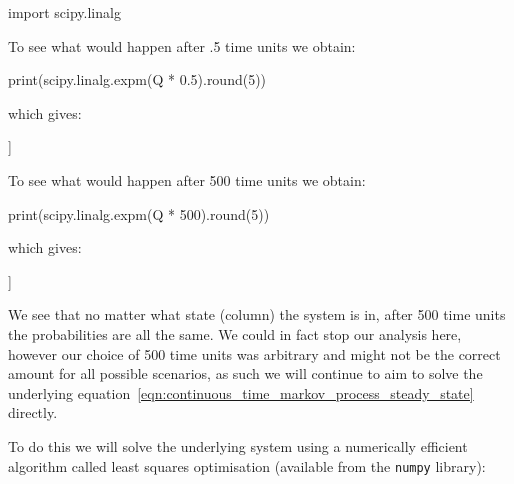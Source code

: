 \begin{pyin}
import scipy.linalg
\end{pyin}

To see what would happen after .5 time units we obtain:

\begin{pyin}
print(scipy.linalg.expm(Q * 0.5).round(5))
\end{pyin}

which gives:

\begin{pyout}
[[0.10492 0.21254 0.20377 0.17142 0.13021 0.09564 0.0815 ]
 [0.08501 0.18292 0.18666 0.1708  0.14377 0.1189  0.11194]
 [0.06521 0.14933 0.16338 0.16478 0.15633 0.14751 0.15346]
 [0.04388 0.10931 0.13183 0.15181 0.16777 0.18398 0.21142]
 [0.02667 0.07361 0.10005 0.13422 0.17393 0.2189  0.27262]
 [0.01567 0.0487  0.07552 0.11775 0.17512 0.24484 0.32239]
 [0.01068 0.03668 0.06286 0.10824 0.17448 0.25791 0.34914]]
\end{pyout}

To see what would happen after 500 time units we obtain:

\begin{pyin}
print(scipy.linalg.expm(Q * 500).round(5))
\end{pyin}

which gives:

\begin{pyout}
[[0.03431 0.08577 0.10722 0.13402 0.16752 0.2094  0.26176]
 [0.03431 0.08577 0.10722 0.13402 0.16752 0.2094  0.26176]
 [0.03431 0.08577 0.10722 0.13402 0.16752 0.2094  0.26176]
 [0.03431 0.08577 0.10722 0.13402 0.16752 0.2094  0.26176]
 [0.03431 0.08577 0.10722 0.13402 0.16752 0.2094  0.26176]
 [0.03431 0.08577 0.10722 0.13402 0.16752 0.2094  0.26176]
 [0.03431 0.08577 0.10722 0.13402 0.16752 0.2094  0.26176]]
\end{pyout}

We see that no matter what state (column) the system is in, after 500 time units
the probabilities are all the same. We could in fact stop our analysis here,
however our choice of 500 time units was arbitrary and might not be the correct
amount for all possible scenarios, as such we will continue to aim to solve the
underlying equation~\ref{eqn:continuous_time_markov_process_steady_state}
directly.

To do this we will solve the underlying system using a numerically efficient
algorithm called least squares optimisation (available from the
\texttt{numpy} library):

